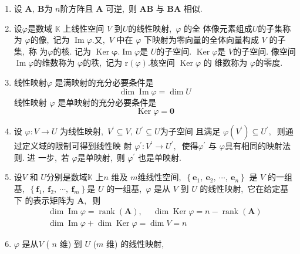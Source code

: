 \begin{enumerate}
		\item 设 $ \boldsymbol{A},\  \boldsymbol{B}  $为 $ n  $阶方阵且 $ \boldsymbol{A} $ 可逆,\  则  $\boldsymbol{AB} $ 与 $ \boldsymbol{BA} $ 相似.
		\item 设$  \varphi  $是数域  $\mathbb{K} $ 上线性空间 $ V $ 到$  U  $的线性映射,\  $ \varphi$  的全 体像元素组成$  U  $的子集称为 $ \varphi  $的像,\  记为 $ \operatorname{Im} \varphi . $又,\  $ V $ 中在 $ \varphi $ 下映射为零向量的全体向量构成  $V$  的子集,\  称 为$  \varphi  $的核. 记为  $\operatorname{Ker} \boldsymbol{\varphi} .
		\operatorname{Im} \varphi  $是 $ U  $的子空间. $ \operatorname{Ker} \varphi  $是 $ V  $的子空间. 像空间  $\operatorname{Im} \varphi  $的维数称为  $\varphi  $的秩,\  记为  $\mathrm{r}(\varphi) . $核空间  $\operatorname{Ker} \varphi $ 的 维数称为 $ \varphi  $的零度.
		\item 线性映射$  \varphi$  是满映射的充分必要条件是
		$$\operatorname{dim} \operatorname{Im} \varphi=\operatorname{dim} U$$
		线性映射 $ \varphi $ 是单映射的充分必要条件是
		$$\operatorname{Ker} \varphi=\mathbf{0}$$
		\item 设  $\varphi: V \rightarrow U $ 为线性映射,\  $ V^{\prime} \subseteq V,\  U^{\prime} \subseteq U  $为子空间 且满足  $\varphi\left(V^{\prime}\right) \subseteq U^{\prime} ,\ $ 则通过定义域的限制可得到线性映 射 $ \varphi^{\prime}: V^{\prime} \rightarrow U^{\prime} ,\ $ 使得$  \varphi^{\prime}$  与 $ \varphi $具有相同的映射法则. 进 一步,\ 若  $\varphi  $是单映射,\  则 $ \varphi^{\prime} $ 也是单映射.
		\item 设$ V $ 和 $ U  $分别是数域$  \mathbb{K} $ 上$  n$  维及  $m  $维线性空间,\  $ \left\{\boldsymbol{e}_{1},\  \boldsymbol{e}_{2},\  \cdots,\  \boldsymbol{e}_{n}\right\} $ 是 $ V$  的一组基,\   $\left\{\boldsymbol{f}_{1},\  \boldsymbol{f}_{2},\  \cdots,\  \boldsymbol{f}_{m}\right\}  $是 $ U $ 的一组基,\   $\varphi $ 是从 $ V $ 到 $ U $ 的线性映射,\  它在给定基下 的表示矩阵为 $ \boldsymbol{A} ,\ $ 则
		$$\begin{array}{c}
			\operatorname{dim} \operatorname{Im} \varphi=\operatorname{rank}(\boldsymbol{A}),\  \quad \operatorname{dim} \operatorname{Ker} \varphi=n-\operatorname{rank}(\boldsymbol{A}) \\
			\operatorname{dim} \operatorname{Im} \varphi+\operatorname{dim} \operatorname{Ker} \varphi=\operatorname{dim} V=n
		\end{array}$$
		\item $ \varphi $ 是从$  V $ (  $n$  维) 到  $U $ ($  m $ 维) 的线性映射,\ 
		\begin{itemize}

\end{itemize}
\end{enumerate}
